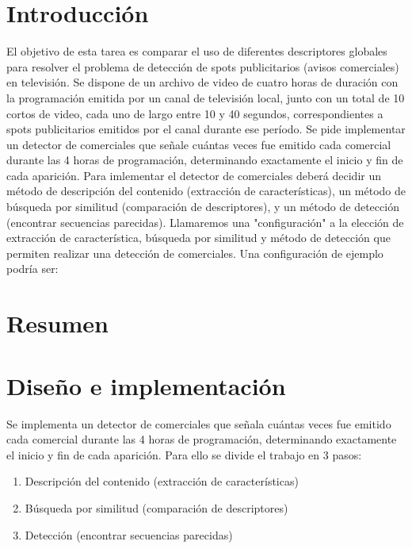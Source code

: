 \documentclass[14pt,letterpaper,hidelinks]{extarticle}
\begin{document}

\renewcommand{\sectionmark}[1]{\markright{\thesection.\ #1}}
\renewcommand{\headrulewidth}{0.5pt}

%
\tableofcontents
\listoffigures
\listoftables

\newpage
\section{Introducción}
El objetivo de esta tarea es comparar el uso de diferentes descriptores globales para resolver el problema de detección de spots publicitarios (avisos comerciales) en televisión. 
Se dispone de un archivo de video de cuatro horas de duración con la programación emitida por un canal de televisión local, junto con un total de 10 cortos de video, cada uno de largo entre 10 y 40 segundos, correspondientes a spots publicitarios emitidos por el canal durante ese período.
Se pide implementar un detector de comerciales que señale cuántas veces fue emitido cada comercial durante las 4 horas de programación, determinando exactamente el inicio y
fin de cada aparición. Para imlementar el detector de comerciales deberá decidir un método de 
descripción del contenido (extracción de características), un método de búsqueda
por similitud (comparación de descriptores), y un método de detección (encontrar
secuencias parecidas).  
Llamaremos una "configuración" a la elección de extracción de característica,
búsqueda por similitud y método de detección que permiten realizar una detección
de comerciales. Una configuración de ejemplo podría ser: 
\section{Resumen}
\section{Diseño e implementación}
Se implementa un detector de comerciales que señala cuántas veces fue emitido cada comercial durante las 4 horas de programación, determinando exactamente el inicio y
fin de cada aparición. Para ello se divide el trabajo en 3 pasos: 
\begin{enumerate}
\item Descripción del contenido (extracción de características)
\item Búsqueda por similitud (comparación de descriptores)
\item Detección (encontrar secuencias parecidas)
\end{enumerate}
\end{document}
